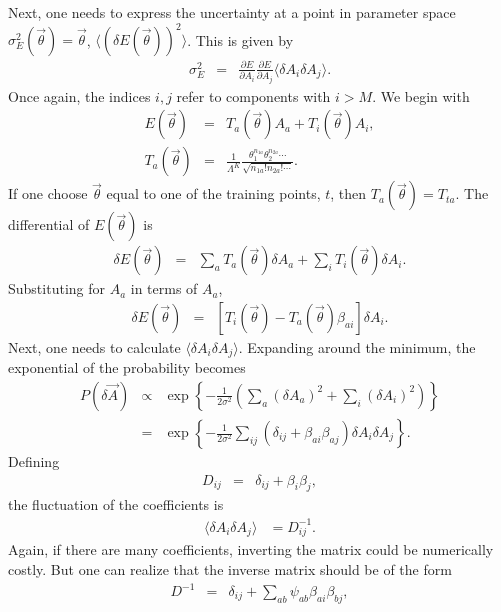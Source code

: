 \documentclass[UserManual.tex]{subfiles}
\begin{document}
Next, one needs to express the uncertainty at a point in parameter space $\sigma_E^2(\vec{\theta})=\vec{\theta}$, $\langle(\delta E(\vec{\theta}))^2\rangle$. This is given by 
\begin{eqnarray}
\sigma_E^2&=&\frac{\partial E}{\partial A_i}\frac{\partial E}{\partial A_j}\langle \delta A_i\delta A_j\rangle. 
\end{eqnarray}
Once again, the indices $i,j$ refer to components with $i>M$. We begin with 
\begin{eqnarray}
E(\vec{\theta})&=&T_a(\vec{\theta})A_a+T_i(\vec{\theta})A_i,\\
\nonumber
T_a(\vec{\theta})&=&\frac{1}{\Lambda^K}\frac{\theta_1^{n_{1a}}\theta_2^{n_{2a}}\cdots}{\sqrt{n_{1a}!n_{2a}!\cdots}}.
\end{eqnarray}
If one choose $\vec{\theta}$ equal to one of the training points, $t$, then $T_a(\vec{\theta})=T_{ta}$. The differential of $E(\vec{\theta})$ is
\begin{eqnarray}
\delta E(\vec{\theta})&=&\sum_aT_a(\vec{\theta})\delta A_a+\sum_iT_i(\vec{\theta})\delta A_i.
\end{eqnarray}
Substituting for $A_a$ in terms of $A_a$, 
\begin{eqnarray}
\delta E(\vec{\theta})&=&\left[T_i(\vec{\theta})-T_a(\vec{\theta})\beta_{ai}\right]\delta A_i.
\end{eqnarray}
Next, one needs to calculate $\langle\delta A_i\delta A_j\rangle$. Expanding around the minimum, the exponential of the probability becomes
\begin{eqnarray}
P(\delta\vec{A})&\propto&
\exp\left\{
-\frac{1}{2\sigma^2}\left(\sum_a(\delta A_a)^2+\sum_i(\delta A_i)^2\right)
\right\}\\
\nonumber
&=&\exp\left\{
-\frac{1}{2\sigma^2}\sum_{ij}\left(\delta_{ij}+\beta_{ai}\beta_{aj}\right)\delta A_i\delta A_j
\right\}.
\end{eqnarray}
Defining
\begin{eqnarray}
D_{ij}&=&\delta_{ij}+\beta_i\beta_j,
\end{eqnarray}
the fluctuation of the coefficients is
\begin{eqnarray}
\langle\delta A_i\delta A_j\rangle&=D^{-1}_{ij}.
\end{eqnarray}
Again, if there are many coefficients, inverting the matrix could be numerically costly. But one can realize that the inverse matrix should be of the form
\begin{eqnarray}
D^{-1}&=&\delta_{ij}+\sum_{ab}\psi_{ab}\beta_{ai}\beta_{bj},
\end{eqnarray}
\end{document}
